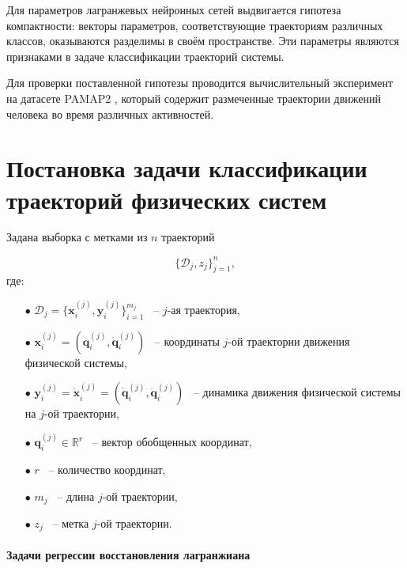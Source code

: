 \documentclass[12pt, twoside]{article}
\begin{document}
    Для параметров лагранжевых нейронных сетей выдвигается гипотеза компактности: векторы параметров, соответствующие траекториям различных классов, оказываются разделимы в своём пространстве. Эти параметры являются признаками в задаче классификации траекторий системы.
    
    Для проверки поставленной гипотезы проводится вычислительный эксперимент на датасете PAMAP2 \cite{PAMAP2}, который содержит размеченные траектории движений человека во время различных активностей.

\newpage
    
\section{Постановка задачи классификации траекторий физических систем}

Задана выборка с метками из $n$ траекторий

    $$\{ \mathcal{D}_j, z_j\}_{j=1}^n,$$ 
    где:
    \begin{itemize}

        \item[$\bullet$] $\mathcal{D}_j = \{ \mathbf{x}_i^{(j)}, \mathbf{y}_i^{(j)} \}_{i=1}^{m_j}$ ~-- $j$-ая траектория,

        \item[$\bullet$] $\mathbf{x}_i^{(j)} = (\mathbf{q}_i^{(j)}, \mathbf{\dot{q}}_i^{(j)})$ ~-- координаты $j$-ой траектории движения физической системы, 

        \item[$\bullet$] $\mathbf{y}_i^{(j)} = \mathbf{\dot{x}}_i^{(j)} = (\mathbf{\dot{q}}_i^{(j)}, \mathbf{\ddot{q}}_i^{(j)})$ ~-- динамика движения физической системы на $j$-ой траектории, 

        \item[$\bullet$] $\mathbf{q}_i^{(j)} \in \mathbb{R}^r$ ~-- вектор обобщенных координат,

        \item[$\bullet$] $r$ ~-- количество координат,

        \item[$\bullet$] $m_j$ ~-- длина $j$-ой траектории,

        \item[$\bullet$] $z_j$ ~-- метка $j$-ой траектории.
        
    \end{itemize}
        
    \paragraph{Задачи регрессии восстановления лагранжиана}
\end{document}
